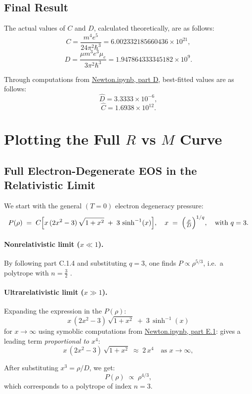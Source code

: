 \documentclass[12pt]{article}
\begin{document}
\subsection{Final Result}

The actual values of \(C\) and \(D\), calculated theoretically, are as follows:
\[
C = \frac{m^4 e^5}{24\pi^2 \hbar^3} = 6.002332185660436 \times 10^{21},
\]
\[
D = \frac{\mu m^3 e^3 \mu_e}{3\pi^2 \hbar^3} = 1.947864333345182 \times 10^{9}.
\]

Through computations from \href{Newton.ipynb}{Newton.ipynb, part D}, best-fitted values are as follows:
\[
\hat{D} = 3.3333 \times 10^{-6},
\]
\[
\hat{C} = 1.6938 \times 10^{12}.
\]

\clearpage

\section{Plotting the Full \(R\) vs \(M\) Curve}

\subsection{Full Electron-Degenerate EOS in the Relativistic Limit}

We start with the general $(T=0)$ electron degeneracy pressure:
\[
P(\rho) \;=\; C 
\Bigl[
  x\,(2x^2 - 3)\,\sqrt{1 + x^2}
  \;+\;
  3\,\sinh^{-1}(x)
\Bigr],
\quad
x \;=\;
\Bigl(\tfrac{\rho}{D}\Bigr)^{1/q},
\quad
\text{with }q = 3.
\]

\paragraph{Nonrelativistic limit ($x \ll 1$).}
By following part C.1.4 and substituting $q = 3$, one finds $P \propto \rho^{5/3}$, i.e.\ a polytrope with $n=\tfrac{3}{2}$ .

\paragraph{Ultrarelativistic limit ($x \gg 1$).}
Expanding the expression in the $P(\rho)$:
\[
x\,(2x^2 -3)\,\sqrt{1 + x^2} \;+\; 3\,\sinh^{-1}(x)
\]
for $x\to\infty$ using symoblic computations from \href{Newton.ipynb}{Newton.ipynb, part E.1}: gives a leading term \emph{proportional to} $x^4$:
\[
x\,(2x^2 - 3)\,\sqrt{1 + x^2}
\;\approx\;
2\,x^4
\quad
\text{as }x\to\infty,
\]

After substituting $x^3 = \rho/D$, we get: 
\[
P(\rho)\;\propto\;\rho^{4/3},
\]
which corresponds to a polytrope of index $n=3.$
\end{document}
